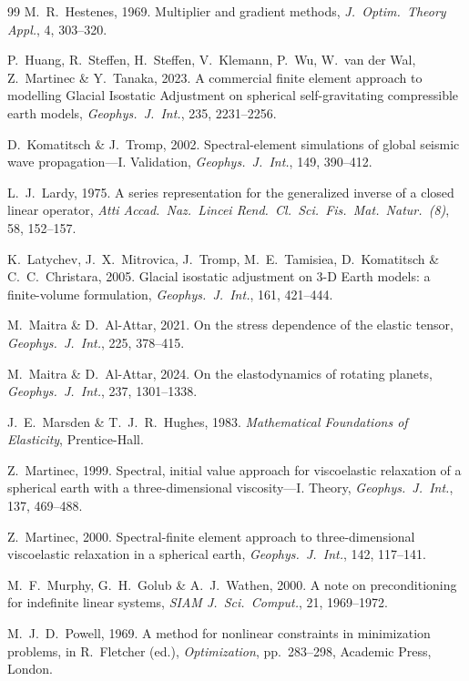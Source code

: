 \documentclass[11pt]{article}
\numberwithin{equation}{section}
\theoremstyle{remark}
\begin{document}
\begin{thebibliography}{99}
M.~R.~Hestenes, 1969.
Multiplier and gradient methods, \emph{J.\ Optim.\ Theory Appl.}, 4,
303--320.

P.~Huang, R.~Steffen, H.~Steffen, V.~Klemann, P.~Wu, W.~van der Wal,
Z.~Martinec \& Y.~Tanaka, 2023.
A commercial finite element approach to modelling Glacial Isostatic
Adjustment on spherical self-gravitating compressible earth models,
\emph{Geophys.\ J.\ Int.}, 235, 2231--2256.

D.~Komatitsch \& J.~Tromp, 2002.
Spectral-element simulations of global seismic wave propagation---I.
Validation, \emph{Geophys.\ J.\ Int.}, 149, 390--412.

L.~J.~Lardy, 1975.
A series representation for the generalized inverse of a closed linear
operator, \emph{Atti Accad.\ Naz.\ Lincei Rend.\ Cl.\ Sci.\ Fis.\ Mat.\
Natur.\ (8)}, 58, 152--157.

K.~Latychev, J.~X.~Mitrovica, J.~Tromp, M.~E.~Tamisiea, D.~Komatitsch \&
C.~C.~Christara, 2005.
Glacial isostatic adjustment on 3-D Earth models: a finite-volume
formulation, \emph{Geophys.\ J.\ Int.}, 161, 421--444.

M.~Maitra \& D.~Al-Attar, 2021.
On the stress dependence of the elastic tensor,
\emph{Geophys.\ J.\ Int.}, 225, 378--415.

M.~Maitra \& D.~Al-Attar, 2024.
On the elastodynamics of rotating planets,
\emph{Geophys.\ J.\ Int.}, 237, 1301--1338.

J.~E.~Marsden \& T.~J.~R.~Hughes, 1983.
\emph{Mathematical Foundations of Elasticity}, Prentice-Hall.

Z.~Martinec, 1999.
Spectral, initial value approach for viscoelastic relaxation of a
spherical earth with a three-dimensional viscosity---I. Theory,
\emph{Geophys.\ J.\ Int.}, 137, 469--488.

Z.~Martinec, 2000.
Spectral-finite element approach to three-dimensional viscoelastic
relaxation in a spherical earth, \emph{Geophys.\ J.\ Int.}, 142, 117--141.

M.~F.~Murphy, G.~H.~Golub \& A.~J.~Wathen, 2000.
A note on preconditioning for indefinite linear systems,
\emph{SIAM J.\ Sci.\ Comput.}, 21, 1969--1972.

M.~J.~D.~Powell, 1969.
A method for nonlinear constraints in minimization problems, in
R.~Fletcher (ed.), \emph{Optimization}, pp.~283--298, Academic Press,
London.


\end{thebibliography}
\end{document}
